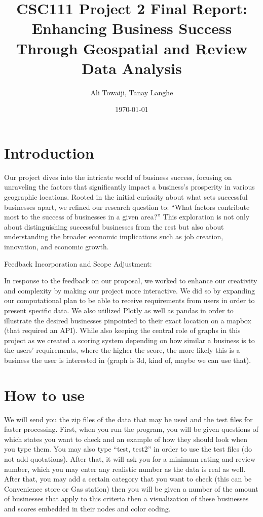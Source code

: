 \documentclass[fontsize=11pt]{article}
\title{CSC111 Project 2 Final Report: Enhancing Business Success Through Geospatial and Review Data Analysis}
\author{Ali Towaiji, Tanay Langhe}
\date{\today}
\begin{document}
\maketitle

\section*{Introduction}

Our project dives into the intricate world of business success, focusing on unraveling the factors that significantly impact a business's prosperity in various geographic locations. Rooted in the initial curiosity about what sets successful businesses apart, we refined our research question to: ``What factors contribute most to the success of businesses in a given area?'' This exploration is not only about distinguishing successful businesses from the rest but also about understanding the broader economic implications such as job creation, innovation, and economic growth.

Feedback Incorporation and Scope Adjustment:

In response to the feedback on our proposal, we worked to enhance our creativity and complexity by making our project more interactive. We did so by expanding our computational plan to be able to receive requirements from users in order to present specific data. We also utilized Plotly as well as pandas in order to illustrate the desired businesses pinpointed to their exact location on a mapbox (that required an API). While also keeping the central role of graphs in this project as we created a scoring system depending on how similar a business is to the users' requirements, where the higher the score, the more likely this is a business the user is interested in (graph is 3d, kind of, maybe we can use that).

\section*{How to use}

We will send you the zip files of the data that may be used and the test files for faster processing. First, when you run the program, you will be given questions of which states you want to check and an example of how they should look when you type them. You may also type ``test, test2'' in order to use the test files (do not add quotations). After that, it will ask you for a minimum rating and review number, which you may enter any realistic number as the data is real as well. After that, you may add a certain category that you want to check (this can be Convenience store or Gas station) then you will be given a number of the amount of businesses that apply to this criteria then a visualization of these businesses and scores embedded in their nodes and color coding.
\end{document}
